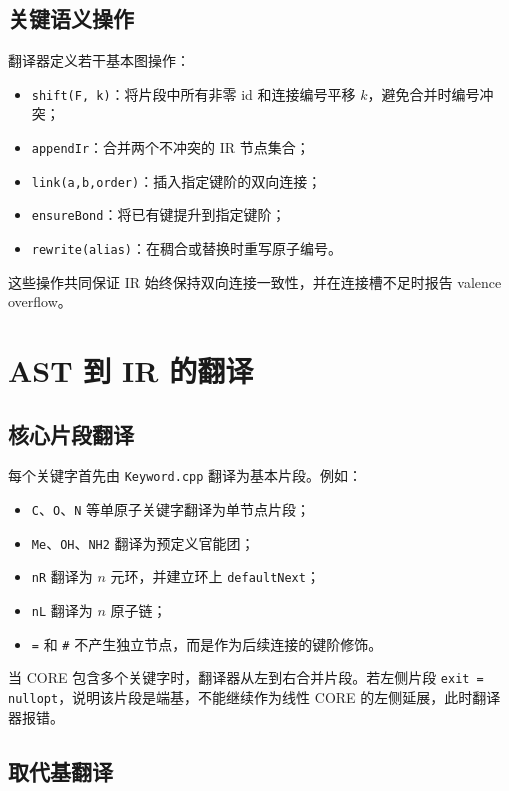 \documentclass[UTF8,a4paper,11pt]{ctexart}
\begin{document}
\subsection{关键语义操作}

翻译器定义若干基本图操作：
\begin{itemize}[leftmargin=2em]
  \item \verb|shift(F, k)|：将片段中所有非零 id 和连接编号平移 $k$，避免合并时编号冲突；
  \item \verb|appendIr|：合并两个不冲突的 IR 节点集合；
  \item \verb|link(a,b,order)|：插入指定键阶的双向连接；
  \item \verb|ensureBond|：将已有键提升到指定键阶；
  \item \verb|rewrite(alias)|：在稠合或替换时重写原子编号。
\end{itemize}

这些操作共同保证 IR 始终保持双向连接一致性，并在连接槽不足时报告 valence overflow。

\section{AST 到 IR 的翻译}

\subsection{核心片段翻译}

每个关键字首先由 \verb|Keyword.cpp| 翻译为基本片段。例如：
\begin{itemize}[leftmargin=2em]
  \item \verb|C|、\verb|O|、\verb|N| 等单原子关键字翻译为单节点片段；
  \item \verb|Me|、\verb|OH|、\verb|NH2| 翻译为预定义官能团；
  \item \verb|nR| 翻译为 $n$ 元环，并建立环上 \verb|defaultNext|；
  \item \verb|nL| 翻译为 $n$ 原子链；
  \item \verb|=| 和 \verb|#| 不产生独立节点，而是作为后续连接的键阶修饰。
\end{itemize}

当 CORE 包含多个关键字时，翻译器从左到右合并片段。若左侧片段 \verb|exit = nullopt|，说明该片段是端基，不能继续作为线性 CORE 的左侧延展，此时翻译器报错。

\subsection{取代基翻译}
\end{document}
